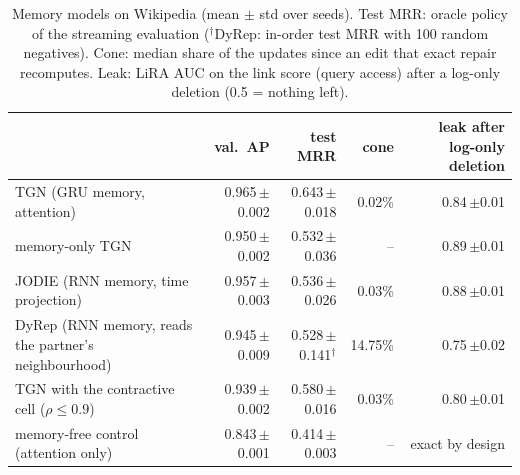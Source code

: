 \begin{table}[!htb]
\centering\scriptsize
\caption{Memory models on Wikipedia (mean $\pm$ std over seeds). Test MRR: oracle policy of the streaming evaluation
($^\dagger$DyRep: in-order test MRR with 100 random negatives). Cone: median share of the updates since an edit that exact
repair recomputes. Leak: LiRA AUC on the link score (query access) after a log-only deletion (0.5 = nothing left).}
\label{tab:arch}
\setlength{\tabcolsep}{3pt}
\begin{tabular}{@{}lrrrr@{}}
\toprule
 & val.\ AP & test MRR & cone & leak after log-only deletion \\
\midrule
TGN (GRU memory, attention) & 0.965\,{\scriptsize$\pm$0.002} & 0.643\,{\scriptsize$\pm$0.018} & 0.02\% & 0.84\,{\scriptsize$\pm$0.01} \\
memory-only TGN & 0.950\,{\scriptsize$\pm$0.002} & 0.532\,{\scriptsize$\pm$0.036} & -- & 0.89\,{\scriptsize$\pm$0.01} \\
JODIE (RNN memory, time projection) & 0.957\,{\scriptsize$\pm$0.003} & 0.536\,{\scriptsize$\pm$0.026} & 0.03\% & 0.88\,{\scriptsize$\pm$0.01} \\
DyRep (RNN memory, reads the partner's neighbourhood) & 0.945\,{\scriptsize$\pm$0.009} & 0.528\,{\scriptsize$\pm$0.141}$^\dagger$ & 14.75\% & 0.75\,{\scriptsize$\pm$0.02} \\
TGN with the contractive cell ($\rho\le0.9$) & 0.939\,{\scriptsize$\pm$0.002} & 0.580\,{\scriptsize$\pm$0.016} & 0.03\% & 0.80\,{\scriptsize$\pm$0.01} \\
memory-free control (attention only) & 0.843\,{\scriptsize$\pm$0.001} & 0.414\,{\scriptsize$\pm$0.003} & -- & exact by design \\
\bottomrule
\end{tabular}
\end{table}
